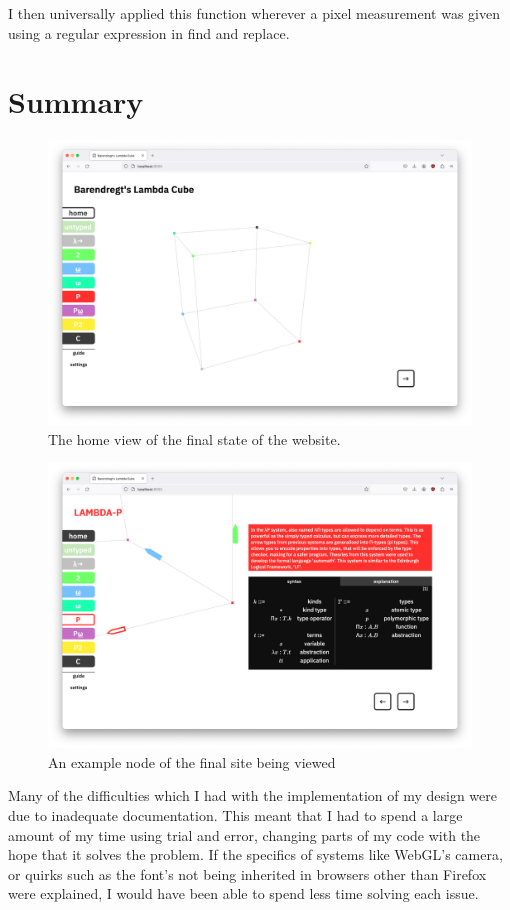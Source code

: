 \documentclass{l4proj}
\begin{document}
I then universally applied this function wherever a pixel measurement was given using a regular expression in find and replace.

\section{Summary}

\begin{figure}[h!]
    \centering
    \includegraphics[width=0.8\linewidth]{dissertation/images/final_home.png}
    \caption{The home view of the final state of the website.}
    \label{fig:enter-label}
\end{figure}

\begin{figure}[h!]
    \centering
    \includegraphics[width=0.8\linewidth]{dissertation/images/final_zoomed.png}
    \caption{An example node of the final site being viewed}
    \label{fig:enter-label}
\end{figure}

Many of the difficulties which I had with the implementation of my design were due to inadequate documentation.  This meant that I had to spend a large amount of my time using trial and error, changing parts of my code with the hope that it solves the problem.  If the specifics of systems like WebGL's camera, or quirks such as the font's not being inherited in browsers other than Firefox were explained, I would have been able to spend less time solving each issue.
\end{document}
